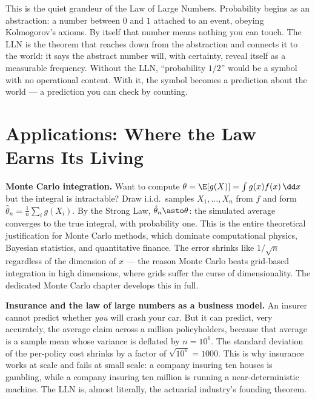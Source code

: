 \begin{aestheticbox}
This is the quiet grandeur of the Law of Large Numbers. Probability begins as an abstraction: a number between $0$ and $1$ attached to an event, obeying Kolmogorov's axioms. By itself that number means nothing you can touch. The LLN is the theorem that reaches down from the abstraction and connects it to the world: it says the abstract number will, with certainty, reveal itself as a measurable frequency. Without the LLN, ``probability $1/2$'' would be a symbol with no operational content. With it, the symbol becomes a prediction about the world --- a prediction you can check by counting.
\end{aestheticbox}

\section{Applications: Where the Law Earns Its Living}
\label{ch20:applications}

\begin{applicationbox}
\textbf{Monte Carlo integration.} Want to compute $\theta = \E[g(X)] = \int g(x)f(x)\,\dd x$ but the integral is intractable? Draw i.i.d.\ samples $X_1,\dots,X_n$ from $f$ and form $\hat\theta_n = \tfrac1n\sum_i g(X_i)$. By the Strong Law, $\hat\theta_n \asto \theta$: the simulated average converges to the true integral, with probability one. This is the entire theoretical justification for Monte Carlo methods, which dominate computational physics, Bayesian statistics, and quantitative finance. The error shrinks like $1/\sqrt n$ regardless of the dimension of $x$ --- the reason Monte Carlo beats grid-based integration in high dimensions, where grids suffer the curse of dimensionality. The dedicated Monte Carlo chapter develops this in full.
\end{applicationbox}

\begin{applicationbox}
\textbf{Insurance and the law of large numbers as a business model.} An insurer cannot predict whether \emph{you} will crash your car. But it can predict, very accurately, the average claim across a million policyholders, because that average is a sample mean whose variance is deflated by $n = 10^6$. The standard deviation of the per-policy cost shrinks by a factor of $\sqrt{10^6} = 1000$. This is why insurance works at scale and fails at small scale: a company insuring ten houses is gambling, while a company insuring ten million is running a near-deterministic machine. The LLN is, almost literally, the actuarial industry's founding theorem.
\end{applicationbox}

